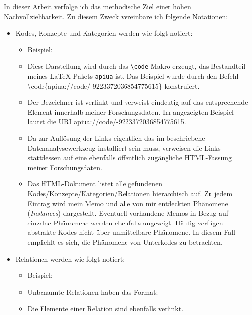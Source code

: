 In dieser Arbeit verfolge ich das methodische Ziel einer hohen Nachvollziehbarkeit. Zu diesem Zweck vereinbare ich folgende Notationen:

\begin{itemize}\raggedright
  \item Kodes, Konzepte und Kategorien werden wie folgt notiert: 
  \begin{itemize}
    \item Beispiel: 
    \item Diese Darstellung wird durch das \texttt{\textbackslash{}code}-Makro erzeugt, das Bestandteil meines \LaTeX-Pakets \texttt{apiua} ist. Das Beispiel wurde durch den Befehl \textbackslash{}code\{apiua://code/-9223372036854775615\} konstruiert.  
    \item Der Bezeichner ist verlinkt und verweist eindeutig auf das entsprechende Element innerhalb meiner Forschungsdaten. Im angezeigten Beispiel lautet die URI \url{apiua://code/-9223372036854775615}.
    \item Da zur Auflösung der Links eigentlich das im  beschriebene Datenanalysewerkzeug installiert sein muss, verweisen die Links stattdessen auf eine ebenfalls öffentlich zugängliche HTML-Fassung meiner Forschungsdaten.
    \item Das HTML-Dokument listet alle gefundenen Kodes/Konzepte/Kategorien/Relationen hierarchisch auf. Zu jedem Eintrag wird mein Memo und alle von mir entdeckten Phänomene (\textit{Instances}) dargestellt. Eventuell vorhandene Memos in Bezug auf einzelne Phänomene werden ebenfalls angezeigt. Häufig verfügen abstrakte Kodes nicht über unmittelbare Phänomene. In diesem Fall empfiehlt es sich, die Phänomene von Unterkodes zu betrachten.
  \end{itemize}
  
  \item Relationen werden wie folgt notiert: 
  \begin{itemize}
    \item Beispiel: \mbox{}
    \item Unbenannte Relationen haben das Format: \mbox{}
    \item Die Elemente einer Relation sind ebenfalls verlinkt.
  \end{itemize}
  

\end{itemize}
